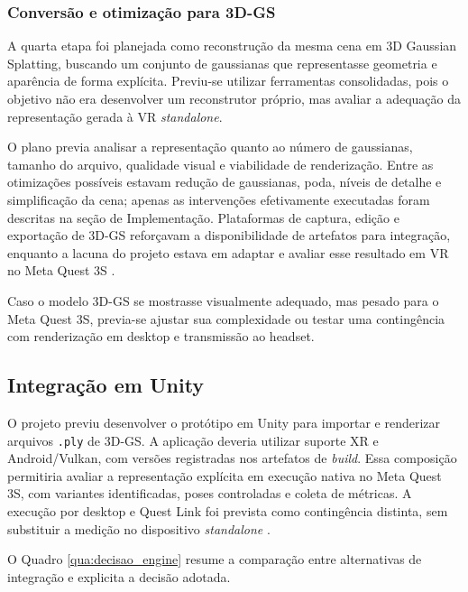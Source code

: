 \subsubsection{Conversão e otimização para 3D-GS}

A quarta etapa foi planejada como reconstrução da mesma cena em 3D Gaussian Splatting, buscando um conjunto de gaussianas que representasse geometria e aparência de forma explícita. Previu-se utilizar ferramentas consolidadas, pois o objetivo não era desenvolver um reconstrutor próprio, mas avaliar a adequação da representação gerada à VR \textit{standalone}.

O plano previa analisar a representação quanto ao número de gaussianas, tamanho do arquivo, qualidade visual e viabilidade de renderização. Entre as otimizações possíveis estavam redução de gaussianas, poda, níveis de detalhe e simplificação da cena; apenas as intervenções efetivamente executadas foram descritas na seção de Implementação. Plataformas de captura, edição e exportação de 3D-GS reforçavam a disponibilidade de artefatos para integração, enquanto a lacuna do projeto estava em adaptar e avaliar esse resultado em VR no Meta Quest 3S \cite{kiri3dgs}.

Caso o modelo 3D-GS se mostrasse visualmente adequado, mas pesado para o Meta Quest 3S, previa-se ajustar sua complexidade ou testar uma contingência com renderização em desktop e transmissão ao headset.

\subsection{Integração em Unity}

O projeto previu desenvolver o protótipo em Unity para importar e renderizar arquivos \texttt{.ply} de 3D-GS. A aplicação deveria utilizar suporte XR e Android/Vulkan, com versões registradas nos artefatos de \textit{build}. Essa composição permitiria avaliar a representação explícita em execução nativa no Meta Quest 3S, com variantes identificadas, poses controladas e coleta de métricas. A execução por desktop e Quest Link foi prevista como contingência distinta, sem substituir a medição no dispositivo \textit{standalone} \cite{metaquest3s2024,qualcommxr2gen2}.

O Quadro \ref{qua:decisao_engine} resume a comparação entre alternativas de integração e explicita a decisão adotada.

